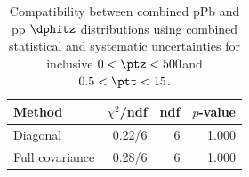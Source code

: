 \begin{table}[htp!]
\centering
\begin{tabular}{|l|r|r|r|}
\hline
Method & $\chi^2$/ndf & ndf & $p$-value \\
\hline
Diagonal & 0.22/6 & 6 & 1.000 \\
Full covariance & 0.28/6 & 6 & 1.000 \\
\hline
\end{tabular}
\caption{Compatibility between combined pPb and pp $\dphitz$ distributions using combined statistical and systematic uncertainties for inclusive $0 < \ptz < 500$\GeV and $0.5 < \ptt < 15$\GeV.}
\label{table:chisq_dphi}
\end{table}
